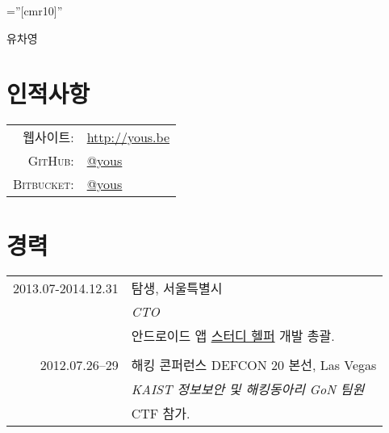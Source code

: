 \documentclass[a4paper,10pt]{article}
\begin{document}

\pagestyle{empty} %

\font\fb=''[cmr10]'' %

\par{\centering
{\Huge 유차영
}\bigskip\par}

\section{인적사항}

\begin{tabular}{rl}
  \textsc{웹사이트:}  & \url{http://yous.be} \\
  \textsc{GitHub:}    & \href{https://github.com/yous}{@yous} \\
  \textsc{Bitbucket:} & \href{https://bitbucket.org/yous}{@yous}
\end{tabular}

\section{경력}
\begin{tabular}{r|p{11cm}}
  \textsc{2013.07-2014.12.31} & \textsc{탐생}, 서울특별시 \\
  & \emph{CTO} \\
  & 안드로이드 앱 \href{https://play.google.com/store/apps/details?id=kr.co.tamseng.StudyHelper}{스터디 헬퍼} 개발 총괄. \\
  \multicolumn{2}{c}{} \\

  \textsc{2012.07.26--29} & \textsc{해킹 콘퍼런스 DEFCON 20 본선}, Las Vegas \\
  & \emph{KAIST 정보보안 및 해킹동아리 GoN 팀원} \\
  & CTF 참가.
\end{tabular}
\end{document}
